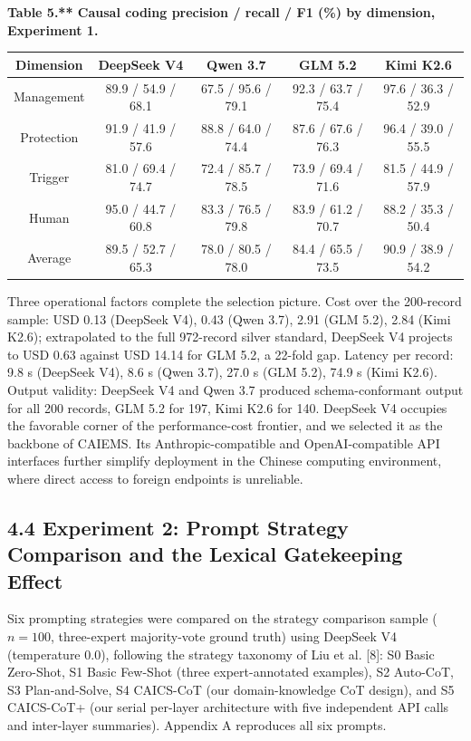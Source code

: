 \documentclass[11pt]{article}
\begin{document}
\textbf{Table 5.** Causal coding precision / recall / F1 (\%) by dimension, Experiment 1.}
\begin{table}[htbp]
\centering
\small
\begin{tabular}{ccccc}
\hline
Dimension & DeepSeek V4 & Qwen 3.7 & GLM 5.2 & Kimi K2.6 \\
\hline
Management & 89.9 / 54.9 / 68.1 & 67.5 / 95.6 / 79.1 & 92.3 / 63.7 / 75.4 & 97.6 / 36.3 / 52.9 \\
Protection & 91.9 / 41.9 / 57.6 & 88.8 / 64.0 / 74.4 & 87.6 / 67.6 / 76.3 & 96.4 / 39.0 / 55.5 \\
Trigger & 81.0 / 69.4 / 74.7 & 72.4 / 85.7 / 78.5 & 73.9 / 69.4 / 71.6 & 81.5 / 44.9 / 57.9 \\
Human & 95.0 / 44.7 / 60.8 & 83.3 / 76.5 / 79.8 & 83.9 / 61.2 / 70.7 & 88.2 / 35.3 / 50.4 \\
Average & 89.5 / 52.7 / 65.3 & 78.0 / 80.5 / 78.0 & 84.4 / 65.5 / 73.5 & 90.9 / 38.9 / 54.2 \\
\hline
\end{tabular}
\end{table}
Three operational factors complete the selection picture. Cost over the 200-record sample: USD 0.13 (DeepSeek V4), 0.43 (Qwen 3.7), 2.91 (GLM 5.2), 2.84 (Kimi K2.6); extrapolated to the full 972-record silver standard, DeepSeek V4 projects to USD 0.63 against USD 14.14 for GLM 5.2, a 22-fold gap. Latency per record: 9.8 s (DeepSeek V4), 8.6 s (Qwen 3.7), 27.0 s (GLM 5.2), 74.9 s (Kimi K2.6). Output validity: DeepSeek V4 and Qwen 3.7 produced schema-conformant output for all 200 records, GLM 5.2 for 197, Kimi K2.6 for 140. DeepSeek V4 occupies the favorable corner of the performance-cost frontier, and we selected it as the backbone of CAIEMS. Its Anthropic-compatible and OpenAI-compatible API interfaces further simplify deployment in the Chinese computing environment, where direct access to foreign endpoints is unreliable.

\subsection{4.4 Experiment 2: Prompt Strategy Comparison and the Lexical Gatekeeping Effect}
Six prompting strategies were compared on the strategy comparison sample ($n=100$, three-expert majority-vote ground truth) using DeepSeek V4 (temperature 0.0), following the strategy taxonomy of Liu et al. [8]: S0 Basic Zero-Shot, S1 Basic Few-Shot (three expert-annotated examples), S2 Auto-CoT, S3 Plan-and-Solve, S4 CAICS-CoT (our domain-knowledge CoT design), and S5 CAICS-CoT+ (our serial per-layer architecture with five independent API calls and inter-layer summaries). Appendix A reproduces all six prompts.
\end{document}
